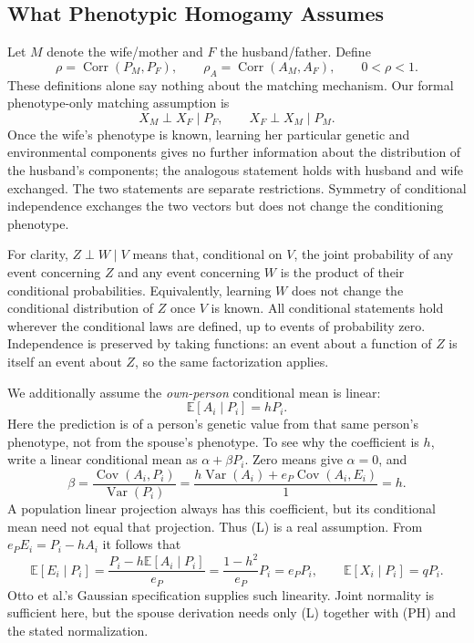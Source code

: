 \subsection{What Phenotypic Homogamy Assumes}
\label{sec:model-ph}

Let $M$ denote the wife/mother and $F$ the husband/father. Define
\[
 \rho=\operatorname{Corr}(P_M,P_F),\qquad
 \rho_A=\operatorname{Corr}(A_M,A_F),\qquad 0<\rho<1.
\]
These definitions alone say nothing about the matching mechanism.
Our formal phenotype-only matching assumption is
\begin{equation}
 X_M\perp X_F\mid P_F,\qquad X_F\perp X_M\mid P_M.
 \tag{PH}\label{eq:model-ph}
\end{equation}
Once the wife's phenotype is known, learning her particular genetic and
environmental components gives no further information about the
distribution of the husband's components; the analogous statement holds
with husband and wife exchanged. The two statements are separate
restrictions. Symmetry of conditional independence exchanges the two
vectors but does not change the conditioning phenotype.

For clarity, $Z\perp W\mid V$ means that, conditional on $V$, the joint
probability of any event concerning $Z$ and any event concerning $W$
is the product of their conditional probabilities. Equivalently, learning
$W$ does not change the conditional distribution of $Z$ once $V$ is known.
All conditional statements hold wherever the conditional laws are
defined, up to events of probability zero. Independence is preserved by
taking functions: an event about a function of $Z$ is itself an event
about $Z$, so the same factorization applies.

We additionally assume the \emph{own-person} conditional mean is linear:
\begin{equation}
 \mathbb E[A_i\mid P_i]=hP_i.
 \tag{L}\label{eq:model-linearity}
\end{equation}
Here the prediction is of a person's genetic value from that same person's
phenotype, not from the spouse's phenotype. To see why the coefficient is
$h$, write a linear conditional mean as $\alpha+\beta P_i$. Zero means give
$\alpha=0$, and
\[
 \beta=\frac{\operatorname{Cov}(A_i,P_i)}{\operatorname{Var}(P_i)}
 =\frac{h\operatorname{Var}(A_i)+e_P\operatorname{Cov}(A_i,E_i)}{1}=h.
\]
A population linear projection always has this coefficient, but its
conditional mean need not equal that projection. Thus (L) is a real
assumption. From $e_P E_i=P_i-hA_i$ it follows that
\[
 \mathbb E[E_i\mid P_i]
 =\frac{P_i-h\mathbb E[A_i\mid P_i]}{e_P}
 =\frac{1-h^2}{e_P}P_i=e_P P_i,\qquad
 \mathbb E[X_i\mid P_i]=qP_i.
\]
Otto et al.'s Gaussian specification supplies such linearity. Joint
normality is sufficient here, but the spouse derivation needs only (L)
together with (PH) and the stated normalization.

